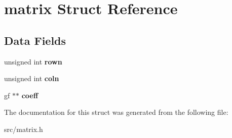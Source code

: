 \hypertarget{structmatrix}{}\section{matrix Struct Reference}
\label{structmatrix}
\subsection*{Data Fields}
\begin{DoxyCompactItemize}
\item 
\mbox{\label{structmatrix_a0e6b7009d531ba82b3de92abd90114a3}} 
unsigned int {\bfseries rown}
\item 
\mbox{\label{structmatrix_a2a80e12fe066ce9cafc0527b562dd270}} 
unsigned int {\bfseries coln}
\item 
\mbox{\label{structmatrix_a1684926400668b59acc7ac6863729441}} 
gf $\ast$$\ast$ {\bfseries coeff}
\end{DoxyCompactItemize}


The documentation for this struct was generated from the following file\+:\begin{DoxyCompactItemize}
\item 
src/matrix.\+h\end{DoxyCompactItemize}
